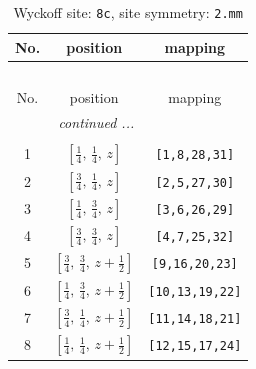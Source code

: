 \documentclass[fleqn,8pt]{jsarticle}
\begin{document}
\renewcommand{\arraystretch}{1.2}
\begin{longtable}{ccc}
\caption{Wyckoff site: {\tt 8c}, site symmetry: {\tt 2.mm}}
 \\
 \hline \hline
No. & position & mapping \\ \hline \endfirsthead

\multicolumn{2}{l}{\tablename\ \thetable{}} \\
 \hline \hline
No. & position & mapping \\ \hline \endhead

 \hline \hline
\multicolumn{2}{r}{\footnotesize\it continued ...} \\ \endfoot

 \hline \hline
\multicolumn{2}{r}{} \\ \endlastfoot

1 & $\left[ \frac{1}{4},\, \frac{1}{4},\, z \right]$ & {\tt [1,8,28,31]} \\ \hline
2 & $\left[ \frac{3}{4},\, \frac{1}{4},\, z \right]$ & {\tt [2,5,27,30]} \\ \hline
3 & $\left[ \frac{1}{4},\, \frac{3}{4},\, z \right]$ & {\tt [3,6,26,29]} \\ \hline
4 & $\left[ \frac{3}{4},\, \frac{3}{4},\, z \right]$ & {\tt [4,7,25,32]} \\ \hline
5 & $\left[ \frac{3}{4},\, \frac{3}{4},\, z + \frac{1}{2} \right]$ & {\tt [9,16,20,23]} \\ \hline
6 & $\left[ \frac{1}{4},\, \frac{3}{4},\, z + \frac{1}{2} \right]$ & {\tt [10,13,19,22]} \\ \hline
7 & $\left[ \frac{3}{4},\, \frac{1}{4},\, z + \frac{1}{2} \right]$ & {\tt [11,14,18,21]} \\ \hline
8 & $\left[ \frac{1}{4},\, \frac{1}{4},\, z + \frac{1}{2} \right]$ & {\tt [12,15,17,24]} \\
\end{longtable}
\renewcommand{\arraystretch}{1.2}
\end{document}
